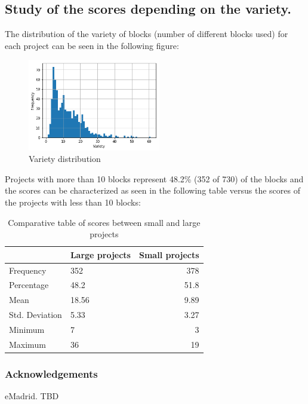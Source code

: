 \documentclass[a4paper]{article}
\begin{document}
\subsection{Study of the scores depending on the variety.}

The distribution of the variety of blocks (number of different blocks used) for each project can be seen in the following figure:

\begin{figure}[ht]
\begin{center}
\includegraphics[height=4cm]{fig1}
\caption{Variety distribution }
\label{fig1}
\end{center}
\end{figure}

Projects with more than 10 blocks represent 48.2\% (352 of 730) of the blocks and the scores can be characterized as seen in the following table versus the scores of the projects with less than 10 blocks:

\begin{table}[ht]
\begin{center}
\caption{Comparative table of scores between small and large projects}

\bigskip

\begin{tabular}{|l|l|r|}
\hline
& Large projects & Small projects \\ \hline
Frequency & 352 & 378\\ \hline
Percentage & 48.2 & 51.8\\ \hline
Mean & 18.56 & 9.89\\ \hline
Std. Deviation & 5.33 & 3.27\\ \hline
Minimum & 7 & 3\\ \hline
Maximum & 36 & 19\\ \hline
\end{tabular}
\end{center}
\end{table}


\subsubsection{Acknowledgements}

eMadrid. TBD


 

\end{document}
